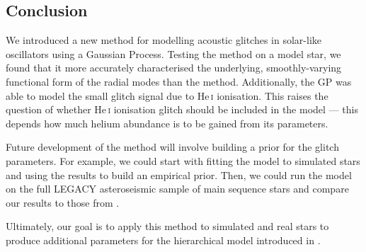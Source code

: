 
\subsection{Conclusion}

We introduced a new method for modelling acoustic glitches in solar-like oscillators using a Gaussian Process. Testing the method on a model star, we found that it more accurately characterised the underlying, smoothly-varying functional form of the radial modes than the 
 method. Additionally, the GP was able to model the small glitch signal due to He\,\textsc{i} ionisation. This raises the question of whether He\,\textsc{i} ionisation glitch should be included in the model --- this depends how much helium abundance is to be gained from its parameters.

Future development of the method will involve building a prior for the glitch parameters. For example, we could start with fitting the model to simulated stars and using the results to build an empirical prior. Then, we could run the model on the full LEGACY asteroseismic sample of main sequence stars \citep{Lund.SilvaAguirre.ea2017} and compare our results to those from \citet{Verma.Raodeo.ea2019}. 

Ultimately, our goal is to apply this method to simulated and real stars to produce additional parameters for the hierarchical model introduced in \citet{Lyttle.Davies.ea2021}.
